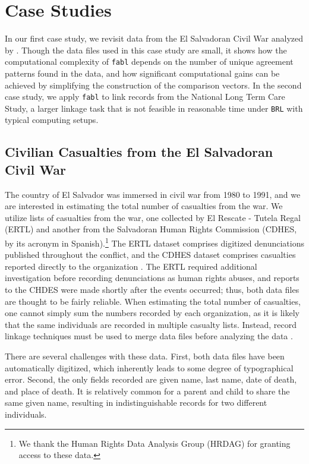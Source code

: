 \documentclass[ba]{imsart}
\begin{document}
	\section{Case Studies}
	\label{sec:case-studies}
	
	In our first case study, we revisit data from the El Salvadoran Civil War analyzed by \cite{sadinle_bayesian_2017}. Though the data files used in this case study are small, it shows how the computational complexity of \texttt{fabl} depends on the number of unique agreement patterns found in the data, and how significant computational gains can be achieved by simplifying the construction of the comparison vectors. In the second case study, we apply \texttt{fabl} to link records from the National Long Term Care Study, a larger linkage task that is not feasible in reasonable time under \texttt{BRL} with typical computing setups. 
	
	\subsection{Civilian Casualties from the El Salvadoran Civil War}
	\label{el_salvador}
	
	The country of El Salvador was immersed in civil war from 1980 to 1991, and we are interested in estimating the total number of casualties from the war. We utilize lists of casualties from the war, one collected by El Rescate - Tutela Regal (ERTL) and another from the Salvadoran Human Rights Commission (CDHES, by its acronym in Spanish).\footnote{We thank the Human Rights Data Analysis Group (HRDAG) for granting access to these data.} The ERTL dataset comprises digitized denunciations published throughout the conflict, and the CDHES dataset comprises casualties reported directly to the organization \citep{howland2008rescate, ball2000salvadoran}. The ERTL required additional investigation before recording denunciations as human rights abuses, and reports to the CHDES were made shortly after the events occurred; thus, both data files are thought to be fairly reliable. When estimating the total number of casualties, one cannot simply sum the numbers recorded by each organization, as it is likely that the same individuals are recorded in multiple casualty lists. Instead, record linkage techniques must be used to merge data files before analyzing the data \citep{lum2013applications}. 
	
	There are several challenges with these data. First, both data files have been automatically digitized, which inherently leads to some degree of typographical error. Second, the only fields recorded are given name, last name, date of death, and place of death. It is relatively common for a parent and child to share the same given name, resulting in indistinguishable records for two different individuals. 
	
\end{document}
